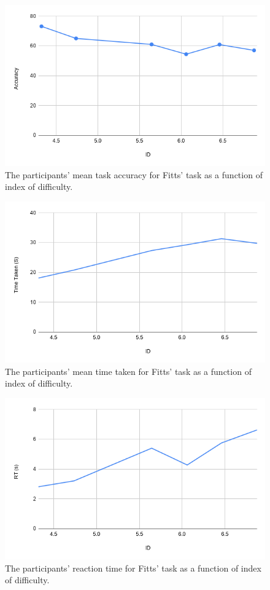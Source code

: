 \begin{figure}
\centering
  \includegraphics[width=0.6\columnwidth]{chapters/04_muifold/figures/user_study_chart_id_accuracy.png}
  \caption{The participants' mean task accuracy for Fitts' task as a function of index of difficulty.}
  \label{fig:user_study_fitts_accuracy}
\end{figure}

\begin{figure}
\centering
  \includegraphics[width=0.6\columnwidth]{chapters/04_muifold/figures/user_study_fitts_time_taken.png}
  \caption{The participants' mean time taken for Fitts' task as a function of index of difficulty.}
  \label{fig:user_study_fitts_time_taken}
\end{figure}

\begin{figure}
\centering
  \includegraphics[width=0.6\columnwidth]{chapters/04_muifold/figures/user_study_fitts_rt.png}
  \caption{The participants' reaction time for Fitts' task as a function of index of difficulty.}
  \label{fig:user_study_fitts_rt}
\end{figure}

